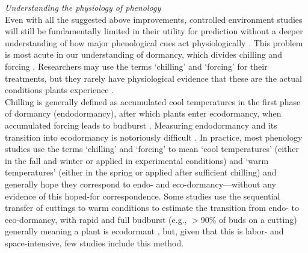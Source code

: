 \documentclass[11pt,letter]{article}
\begin{document}

\emph{Understanding the physiology of phenology}\\
Even with all the suggested above improvements, controlled environment studies will still be fundamentally limited in their utility for prediction without a deeper understanding of how major phenological cues act physiologically \citep{Bahuguna2015}. This problem is most acute in our understanding of dormancy, which divides chilling and forcing \citep{singh2019,chang2021}. Researchers may use the terms `chilling' and `forcing' for their treatments, but they rarely have physiological evidence that these are the actual conditions plants experience \citep[][]{chuine2016}. \\

Chilling is generally defined as accumulated cool temperatures in the first phase of dormancy (endodormancy), after which plants enter ecodormancy, when accumulated forcing leads to budburst \citep{chuine2016}. Measuring endodormancy and its transition into ecodormancy is notoriously difficult  \citep[e.g.,][]{Junttila:2012aa}. In practice, most phenology studies use the terms `chilling' and `forcing' to mean `cool temperatures' (either in the fall and winter or applied in experimental conditions) and `warm temperatures' (either in the spring or applied after sufficient chilling) and generally hope they correspond to endo- and eco-dormancy---without any evidence of this hoped-for correspondence. Some studies use the sequential transfer of cuttings to warm conditions to estimate the transition from endo- to eco-dormancy, with rapid and full budburst (e.g., $>$90\% of buds on a cutting) generally meaning a plant is ecodormant \citep[e.g.,][]{Junttila:2012aa}, but, given that this is labor- and space-intensive, few studies include this method. \\
\end{document}
